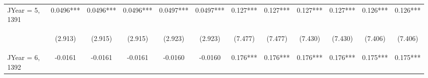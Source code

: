 \documentclass[]{article}
\begin{document}
\begin{center}
\begin{tabular}{lccccccccccc}
JYear = 5, 1391 & 0.0496*** & 0.0496*** & 0.0496*** & 0.0497*** & 0.0497*** & 0.127*** & 0.127*** & 0.127*** & 0.127*** & 0.126*** & 0.126*** \\
\vspace{4pt} & \begin{footnotesize}(2.913)\end{footnotesize} & \begin{footnotesize}(2.915)\end{footnotesize} & \begin{footnotesize}(2.915)\end{footnotesize} & \begin{footnotesize}(2.923)\end{footnotesize} & \begin{footnotesize}(2.923)\end{footnotesize} & \begin{footnotesize}(7.477)\end{footnotesize} & \begin{footnotesize}(7.477)\end{footnotesize} & \begin{footnotesize}(7.430)\end{footnotesize} & \begin{footnotesize}(7.430)\end{footnotesize} & \begin{footnotesize}(7.406)\end{footnotesize} & \begin{footnotesize}(7.406)\end{footnotesize} \\
JYear = 6, 1392 & -0.0161 & -0.0161 & -0.0161 & -0.0160 & -0.0160 & 0.176*** & 0.176*** & 0.176*** & 0.176*** & 0.175*** & 0.175*** \\

\end{tabular}
\end{center}
\end{document}
